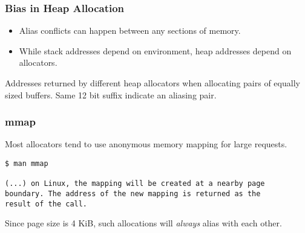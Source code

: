 \documentclass{beamer}
\begin{document}

\begin{frame}[fragile]
\frametitle{Bias in Heap Allocation}

\begin{itemize}
  \item Alias conflicts can happen between any sections of memory.
  \item While stack addresses depend on environment, heap addresses depend on allocators.
\end{itemize}

\begin{table}
  \caption{Addresses returned by different heap allocators when allocating pairs of equally sized buffers. Same 12 bit suffix indicate an aliasing pair.}
\end{table}





\end{frame}

\begin{frame}[fragile]
  \frametitle{mmap}

Most allocators tend to use anonymous memory mapping for large requests.

\begin{lstlisting}[frame=single, xleftmargin=.01\textwidth, xrightmargin=.01\textwidth, belowskip=1cm]
$ man mmap

(...) on Linux, the mapping will be created at a nearby page
boundary. The address of the new mapping is returned as the
result of the call.

\end{lstlisting}

Since page size is 4 KiB, such allocations will \emph{always} alias with each other.

\end{frame}
\end{document}
